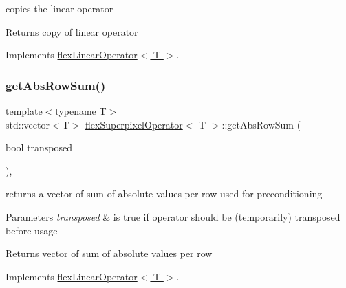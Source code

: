 copies the linear operator 

\begin{DoxyReturn}{Returns}
copy of linear operator 
\end{DoxyReturn}


Implements \hyperlink{classflex_linear_operator_a7cc1425677cc30fcbd092ffd28d508c9}{flex\+Linear\+Operator$<$ T $>$}.

\mbox{\label{classflex_superpixel_operator_afd3f55401eaa6fb3e8a62c7f83443a4d}} 
\subsubsection{\texorpdfstring{get\+Abs\+Row\+Sum()}{getAbsRowSum()}}
{\footnotesize\ttfamily template$<$typename T$>$ \\
std\+::vector$<$T$>$ \hyperlink{classflex_superpixel_operator}{flex\+Superpixel\+Operator}$<$ T $>$\+::get\+Abs\+Row\+Sum (\begin{DoxyParamCaption}\item[{bool}]{transposed }\end{DoxyParamCaption})\hspace{0.3cm}{\ttfamily [inline]}, {\ttfamily [virtual]}}



returns a vector of sum of absolute values per row used for preconditioning 


\begin{DoxyParams}{Parameters}
{\em transposed} & is true if operator should be (temporarily) transposed before usage \\
\hline
\end{DoxyParams}
\begin{DoxyReturn}{Returns}
vector of sum of absolute values per row 
\end{DoxyReturn}


Implements \hyperlink{classflex_linear_operator_ad6caa7b09e6e3c401cadef61b8e2307e}{flex\+Linear\+Operator$<$ T $>$}.

\mbox{\label{classflex_superpixel_operator_ae2f878d68c4574a0d5f21ffd132afc63}} 
